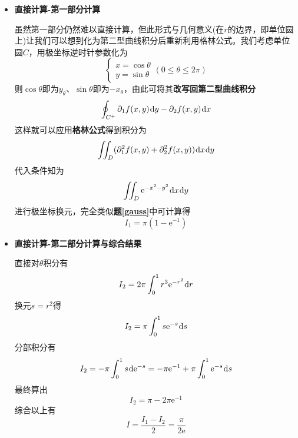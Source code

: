 \documentclass[a4paper,UTF8,fontset=windows,AutoFakeBold]{ctexart}
\newcommand*{\dr}{\hspace{0.07em}\mathrm{d}}
\newcommand*{\er}{\mathrm{e}}
\theoremstyle{ex}
\newcommand{\exref}[1]{\textbf{题\;\ref{#1}\;}}
\begin{document}
\begin{framed}
{\begin{itemize}
        由于$r$与$\theta$互相不影响，可以将对$r$的分部积分结果改写为
        $$\begin{aligned}I=&\frac{1}{3}\int_0^{2\pi}(\cos\theta\partial_1f(\cos\theta,\sin\theta)+\sin\theta\partial_2f(\cos\theta,\sin\theta))\dr\theta\\ &-\frac{1}{3}\int_0^1\dr r\int_0^{2\pi}r^3(\cos^2\theta\partial_1^2f+2\cos\theta\sin\theta\partial_1\partial_2f+\sin^2\theta\partial_2^2f)\dr\theta\end{aligned}$$
        对比之前分部积分得到的
        $$I=\int_0^1\dr r\int_0^{2\pi}r^3(\sin^2\theta\partial_1^2f-2\sin\theta\cos\theta\partial_1\partial_2f+\cos^2\theta\partial_2^2f)\dr\theta$$
        第一式的三倍减去第二式即得
        $$2I=\int_0^{2\pi}(\cos\theta\partial_1f(\cos\theta,\sin\theta)+\sin\theta\partial_2f(\cos\theta,\sin\theta))\dr\theta-\int_0^1\dr r\int_0^{2\pi}r^3(\partial_1^2f+\partial_2^2f)\dr\theta$$
        这时终于可以应用条件得到
        $$2I=\int_0^{2\pi}(\cos\theta\partial_1f(\cos\theta,\sin\theta)+\sin\theta\partial_2f(\cos\theta,\sin\theta))\dr\theta-\int_0^1\dr r\int_0^{2\pi}r^3\er^{-r^2}\dr\theta$$
        我们拆分为两部分
        $$I_1=\int_0^{2\pi}(\cos\theta\partial_1f(\cos\theta,\sin\theta)+\sin\theta\partial_2f(\cos\theta,\sin\theta))\dr\theta$$
        $$I_2=\int_0^1\dr r\int_0^{2\pi}r^3\er^{-r^2}\dr\theta$$

        \item \textbf{直接计算-第一部分计算}
        
        虽然第一部分仍然难以直接计算，但此形式与几何意义(在$r$的边界，即单位圆上)让我们可以想到化为第二型曲线积分后重新利用格林公式。我们考虑单位圆$C$，用极坐标逆时针参数化为
        $$\begin{cases}x=\cos\theta\\y=\sin\theta\end{cases}(0\le\theta\le2\pi)$$
        则$\cos\theta$即为$y_\theta$、$\sin\theta$即为$-x_\theta$，由此可将其\textbf{改写回第二型曲线积分}
        $$\oint_{C^+}\partial_1f(x,y)\dr y-\partial_2f(x,y)\dr x$$
        这样就可以应用\textbf{格林公式}得到积分为
        $$\iint_D(\partial_1^2f(x,y)+\partial_2^2f(x,y))\dr x\dr y$$
        代入条件知为
        $$\iint_D\er^{-x^2-y^2}\dr x\dr y$$
        进行极坐标换元，完全类似\exref{gauss}中可计算得
        $$I_1=\pi(1-\er^{-1})$$

        \item \textbf{直接计算-第二部分计算与综合结果}
        
        直接对$\theta$积分有
        $$I_2=2\pi\int_0^1r^3\er^{-r^2}\dr r$$
        换元$s=r^2$得
        $$I_2=\pi\int_0^1s\er^{-s}\dr s$$
        分部积分有
        $$I_2=-\pi\int_0^1s\dr\er^{-s}=-\pi\er^{-1}+\pi\int_0^1\er^{-s}\dr s$$
        最终算出
        $$I_2=\pi-2\pi\er^{-1}$$
        综合以上有
        $$I=\frac{I_1-I_2}{2}=\frac{\pi}{2\er}$$


\end{itemize}}
\end{framed}
\end{document}
